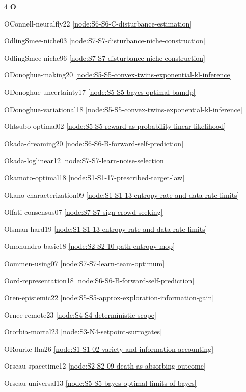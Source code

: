 \documentclass[10pt]{article}
\begin{document}
{\begin{multicols}{4}
\smallskip\textbf{O}\par
OConnell-neuralfly22 \hfill \ref{node:S6-S6-C-disturbance-estimation}\par
OdlingSmee-niche03 \hfill \ref{node:S7-S7-disturbance-niche-construction}\par
OdlingSmee-niche96 \hfill \ref{node:S7-S7-disturbance-niche-construction}\par
ODonoghue-making20 \hfill \ref{node:S5-S5-convex-twins-exponential-kl-inference}\par
ODonoghue-uncertainty17 \hfill \ref{node:S5-S5-bayes-optimal-bamdp}\par
ODonoghue-variational18 \hfill \ref{node:S5-S5-convex-twins-exponential-kl-inference}\par
Ohtsubo-optimal02 \hfill \ref{node:S5-S5-reward-as-probability-linear-likelihood}\par
Okada-dreaming20 \hfill \ref{node:S6-S6-B-forward-self-prediction}\par
Okada-loglinear12 \hfill \ref{node:S7-S7-learn-noise-selection}\par
Okamoto-optimal18 \hfill \ref{node:S1-S1-17-prescribed-target-law}\par
Okano-characterization09 \hfill \ref{node:S1-S1-13-entropy-rate-and-data-rate-limits}\par
Olfati-consensus07 \hfill \ref{node:S7-S7-sign-crowd-seeking}\par
Olsman-hard19 \hfill \ref{node:S1-S1-13-entropy-rate-and-data-rate-limits}\par
Omohundro-basic18 \hfill \ref{node:S2-S2-10-path-entropy-mop}\par
Oommen-using07 \hfill \ref{node:S7-S7-learn-team-optimum}\par
Oord-representation18 \hfill \ref{node:S6-S6-B-forward-self-prediction}\par
Oren-epistemic22 \hfill \ref{node:S5-S5-approx-exploration-information-gain}\par
Ornee-remote23 \hfill \ref{node:S4-S4-deterministic-scope}\par
Ororbia-mortal23 \hfill \ref{node:S3-N4-setpoint-surrogates}\par
ORourke-llm26 \hfill \ref{node:S1-S1-02-variety-and-information-accounting}\par
Orseau-spacetime12 \hfill \ref{node:S2-S2-09-death-as-absorbing-outcome}\par
Orseau-universal13 \hfill \ref{node:S5-S5-bayes-optimal-limits-of-bayes}\par

\end{multicols}}
\end{document}
